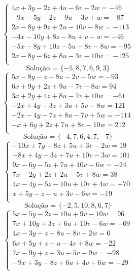\documentclass[12pt,oneside,a4paper]{article}
\begin{document}
\vspace{\baselineskip}
\begin{equation*}
\begin{cases}
4x+3y-2z+4u-6v-2w=-46 \\
-9x-5y-2z-9u-3v+w=-87 \\
2x-8y+9z+2u-10v-8w=-113 \\
-4x-10y+8z-8u+v-w=-46 \\
-5x-8y+10z-5u-8v-8w=-95 \\
2x-8y-6z+8u-3v-10w=-125 \\
\end{cases}
\end{equation*}
\begin{equation*}
\text{Solução = }\{-5,8,7,6,9,3\}
\end{equation*}
\vspace{\baselineskip}
\begin{equation*}
\begin{cases}
5x-8y-z-8u-2v-5w=-93 \\
6x+9y+2z+9u-7v-8w=94 \\
3x+2y+4z+8u-7v+10w=-61 \\
-2x+4y-3z+3u+5v-8w=121 \\
-2x-4y-7z+8u-7v+5w=-114 \\
-x+6y+2z+7u+8v-10w=212 \\
\end{cases}
\end{equation*}
\begin{equation*}
\text{Solução = }\{-4,7,6,4,7,-7\}
\end{equation*}
\vspace{\baselineskip}
\begin{equation*}
\begin{cases}
-10x+7y-8z+5u+3v-2w=19 \\
-8x+4y-3z+7u+10v-3w=101 \\
9x-6y-5z+7u+10v-6w=-24 \\
7x-2y+2z+2u-5v+8w=38 \\
4x-4y-5z-10u+10v+4w=-70 \\
x+5y-z-u+3v-6w=-19 \\
\end{cases}
\end{equation*}
\begin{equation*}
\text{Solução = }\{-2,5,10,8,6,7\}
\end{equation*}
\vspace{\baselineskip}
\begin{equation*}
\begin{cases}
5x-5y-2z-10u+9v-10w=96 \\
7x+10y+3z+6u+10v-6w=-69 \\
4x-3y-z-8u-8v-2w=6 \\
6x+5y+z+u-4v+8w=-22 \\
7x-9y+z+3u-5v-9w=-98 \\
-9x+3y-8z+6u+4v+6w=-29 \\
\end{cases}
\end{equation*}
\end{document}
